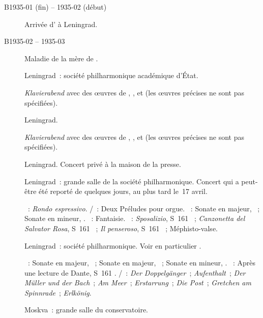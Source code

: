 \begin{description}
 \item[B1935-01 (fin) -- 1935-02 (début)]
 Arrivée d'\ESofronitskaya{} à Leningrad.
 \item[B1935-02 -- 1935-03]
 Maladie de la mère de \VSofronitsky{}.
 \item[]
 Leningrad~: société philharmonique académique d'\hbox{État}.

 \foreignlanguage{german}{\emph{Klavierabend}} avec des œuvres de
 \GHaendel{}, \JBach{}, \RSchumann{} et \FChopin{} (les œuvres précises ne
 sont pas spécifiées).
 \item[]
 Leningrad.

 \foreignlanguage{german}{\emph{Klavierabend}} avec des œuvres de
 \GHaendel{}, \JBach{}, \RSchumann{} et \FChopin{} (les œuvres précises ne
 sont pas spécifiées).
 \item[]
 Leningrad.
 Concert privé à la maison de la presse.
 \item[]
 Leningrad~: grande salle de la société philharmonique.
 Concert qui a peut-être été reporté de quelques jours, au plus tard le~17
 avril.

 \textsc{\CBach{}}~: \emph{Rondo espressivo}.
 \textsc{\JBach{}/\Busoni{}}~: Deux Préludes pour orgue.
 \textsc{\Beethoven{}}~: Sonate en \kD majeur,  ~; Sonate
 en \kC mineur, .
 \textsc{\Chopin{}}~: Fantaisie.
 \textsc{\Liszt{}}~: \emph{Sposalizio}, S~161 ~; \emph{Canzonetta
 del Salvator Rosa}, S~161 ~; \emph{Il penseroso}, S~161
 ~; Méphisto-valse.
 \item[]
 Leningrad~: société philharmonique.
 Voir en particulier \citet[p.~427]{Milshteyn82a}.

 \textsc{\Beethoven{}}~: Sonate en \kD majeur, ~; Sonate en \kF
 \Sharp majeur, ~; Sonate en \kC \Sharp mineur, 
 .
 \textsc{\Liszt{}}~: Après une lecture de Dante, S~161 .
 \textsc{\Schubert{}/\Liszt{}}~: \emph{Der Doppelgänger}~;
 \emph{Aufenthalt}~; \emph{Der Müller und der Bach}~; \emph{Am Meer}~;
 \emph{Erstarrung}~; \emph{Die Post}~; \emph{Gretchen am Spinnrade}~;
 \emph{Erlkönig}.
 \item[]
 Moskva~: grande salle du conservatoire.


\end{description}
